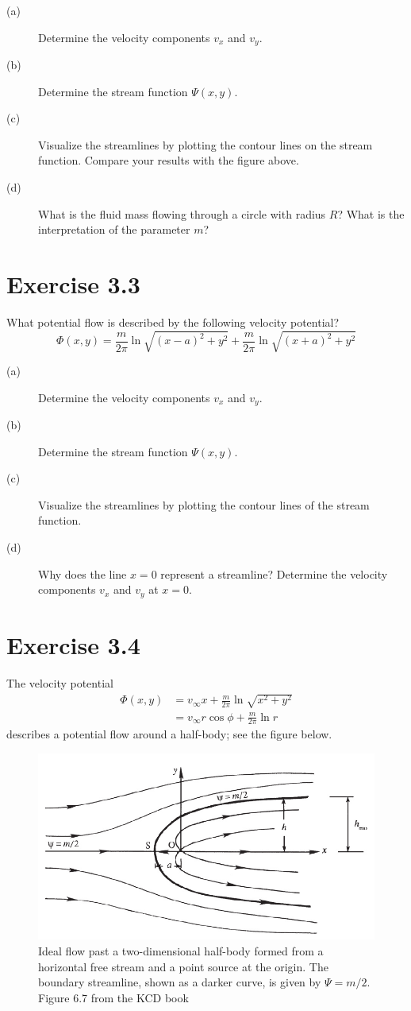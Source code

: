 \documentclass[a4paper, 10pt]{article}
\begin{document}
\begin{description}
	\item[(a)]
	Determine the velocity components $v_x$ and $v_y$.
	\item[(b)]
	Determine the stream function $\Psi(x,y)$.
	\item[(c)]
	Visualize the streamlines by plotting the contour lines on the stream function. Compare your results with the figure above.
	\item[(d)]
	What is the fluid mass flowing through a circle with radius $R$? What is the interpretation of the parameter $m$?
\end{description}

\section{Exercise 3.3}
What potential flow is described by the following velocity potential?
\begin{equation}
\Phi(x,y) = \frac{m}{2\pi}\ln\sqrt{(x-a)^2 + y^2} + \frac{m}{2\pi}\ln\sqrt{(x+a)^2+y^2}
\end{equation}

\begin{description}
	\item[(a)]
	Determine the velocity components $v_x$ and $v_y$.
	\item[(b)]
	Determine the stream function $\Psi(x,y)$.
	\item[(c)]
	Visualize the streamlines by plotting the contour lines of the stream function.
	\item[(d)]
	Why does the line $x=0$ represent a streamline? Determine the velocity components $v_x$ and $v_y$ at $x=0$.
\end{description}

\section{Exercise 3.4}
The velocity potential
\begin{align}
\Phi(x,y) &= v_\infty x + \frac{m}{2\pi}\ln\sqrt{x^2+y^2}\\
&= v_\infty r\cos\phi+\frac{m}{2\pi}\ln r
\end{align}
describes a potential flow around a half-body; see the figure below.
\begin{figure}[h!]
	\centering
	\includegraphics[width=.7\textwidth]{kcd2}
	\caption{Ideal flow past a two-dimensional half-body formed from a horizontal free stream and a point source at the origin. The boundary streamline, shown as a darker curve, is given by $\Psi=m/2$. Figure 6.7 from the KCD book}
\end{figure}
\end{document}
